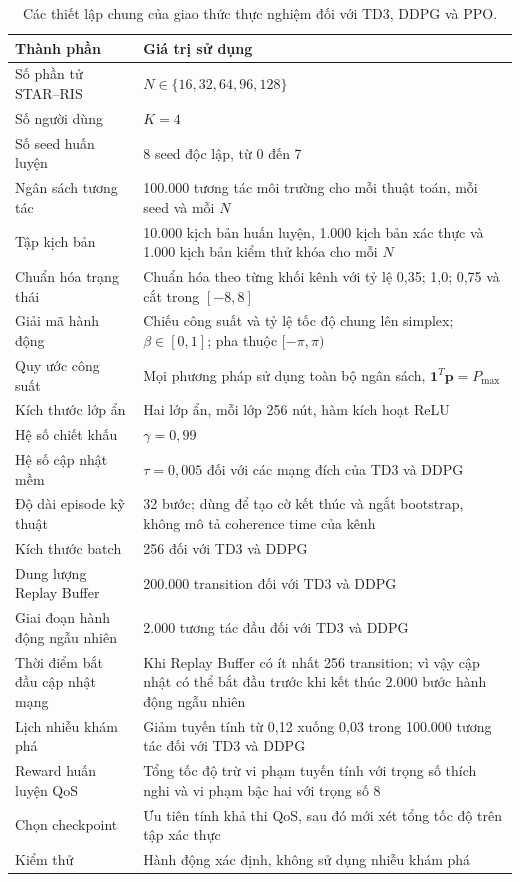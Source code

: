 
\begin{table}[htbp]
  \centering
  \caption{Các thiết lập chung của giao thức thực nghiệm đối với TD3, DDPG và PPO.}
  \label{tab:drl-common-protocol}
  \small
  \begin{tabularx}{\textwidth}{>{\raggedright\arraybackslash}p{}X}
    \toprule
    \textbf{Thành phần} & \textbf{Giá trị sử dụng} \\
    \midrule
    Số phần tử STAR--RIS & $N\in\{16,32,64,96,128\}$ \\
    Số người dùng & $K=4$ \\
    Số seed huấn luyện & 8 seed độc lập, từ 0 đến 7 \\
    Ngân sách tương tác & 100.000 tương tác môi trường cho mỗi thuật toán, mỗi seed và mỗi $N$ \\
    Tập kịch bản & 10.000 kịch bản huấn luyện, 1.000 kịch bản xác thực và 1.000 kịch bản kiểm thử khóa cho mỗi $N$ \\
    Chuẩn hóa trạng thái & Chuẩn hóa theo từng khối kênh với tỷ lệ 0,35; 1,0; 0,75 và cắt trong $[-8,8]$ \\
    Giải mã hành động & Chiếu công suất và tỷ lệ tốc độ chung lên simplex; $\beta\in[0,1]$; pha thuộc $[-\pi,\pi)$ \\
    Quy ước công suất & Mọi phương pháp sử dụng toàn bộ ngân sách, $\mathbf{1}^T\bm p=P_{\max}$ \\
    Kích thước lớp ẩn & Hai lớp ẩn, mỗi lớp 256 nút, hàm kích hoạt ReLU \\
    Hệ số chiết khấu & $\gamma=0{,}99$ \\
    Hệ số cập nhật mềm & $\tau=0{,}005$ đối với các mạng đích của TD3 và DDPG \\
    Độ dài episode kỹ thuật & 32 bước; dùng để tạo cờ kết thúc và ngắt bootstrap, không mô tả coherence time của kênh \\
    Kích thước batch & 256 đối với TD3 và DDPG \\
    Dung lượng Replay Buffer & 200.000 transition đối với TD3 và DDPG \\
    Giai đoạn hành động ngẫu nhiên & 2.000 tương tác đầu đối với TD3 và DDPG \\
    Thời điểm bắt đầu cập nhật mạng & Khi Replay Buffer có ít nhất 256 transition; vì vậy cập nhật có thể bắt đầu trước khi kết thúc 2.000 bước hành động ngẫu nhiên \\
    Lịch nhiễu khám phá & Giảm tuyến tính từ 0,12 xuống 0,03 trong 100.000 tương tác đối với TD3 và DDPG \\
    Reward huấn luyện QoS & Tổng tốc độ trừ vi phạm tuyến tính với trọng số thích nghi và vi phạm bậc hai với trọng số 8 \\
    Chọn checkpoint & Ưu tiên tính khả thi QoS, sau đó mới xét tổng tốc độ trên tập xác thực \\
    Kiểm thử & Hành động xác định, không sử dụng nhiễu khám phá \\
    \bottomrule
  \end{tabularx}
\end{table}

